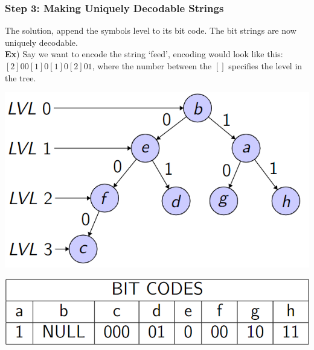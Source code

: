 \documentclass{beamer}
\begin{document}
\begin{frame}
    \frametitle{Step 3: Making Uniquely Decodable Strings}
The solution, append the symbols level to its bit code. The bit strings are now uniquely decodable.\\
\large\textbf{Ex}) Say we want to encode the string `feed',
encoding would look like this: $[2]00[1]0[1]0[2]01$, where the number between the $[]$ 
specifies the level in the tree.
\begin{center}
    \begin{minipage}{0.2\textwidth}
      \centering
      \includegraphics[scale=0.35]{images/bintree.png}
    \end{minipage}
    \hfill
    \begin{minipage}{0.4\textwidth}
      \centering
      \includegraphics[scale=.29]{images/bitcode.png}
    \end{minipage}
\end{center}
\end{frame}
\end{document}
